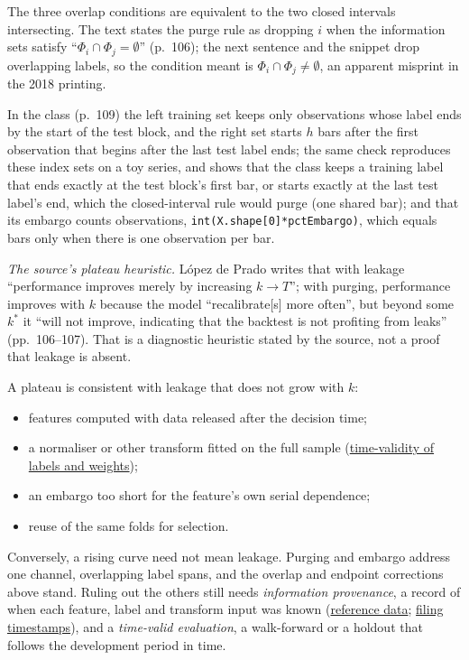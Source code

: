 \begin{qfmethod}
 The three overlap conditions are equivalent to the two closed intervals intersecting. The text states the purge rule as dropping $i$ when the information sets satisfy ``$\Phi_i\cap\Phi_j=\emptyset$'' (p.~106); the next sentence and the snippet drop overlapping labels, so the condition meant is $\Phi_i\cap\Phi_j\neq\emptyset$, an apparent misprint in the 2018 printing.

In the class (p.~109) the left training set keeps only observations whose label ends by the start of the test block, and the right set starts $h$ bars after the first observation that begins after the last test label ends; the same check reproduces these index sets on a toy series, and shows that the class keeps a training label that ends exactly at the test block's first bar, or starts exactly at the last test label's end, which the closed-interval rule would purge (one shared bar); and that its embargo counts observations, \texttt{int(X.shape[0]*pctEmbargo)}, which equals bars only when there is one observation per bar.

\emph{The source's plateau heuristic.} López de Prado writes that with leakage ``performance improves merely by increasing $k\to T$''; with purging, performance improves with $k$ because the model ``recalibrate[s] more often'', but beyond some $k^*$ it ``will not improve, indicating that the backtest is not profiting from leaks'' (pp.~106--107). That is a diagnostic heuristic stated by the source, not a proof that leakage is absent.

A plateau is consistent with leakage that does not grow with $k$:
\begin{itemize}
\item features computed with data released after the decision time;
\item a normaliser or other transform fitted on the full sample (\hyperref[pit:label-weight-leakage]{time-validity of labels and weights});
\item an embargo too short for the feature's own serial dependence;
\item reuse of the same folds for selection.
\end{itemize}
Conversely, a rising curve need not mean leakage. Purging and embargo address one channel, overlapping label spans, and the overlap and endpoint corrections above stand. Ruling out the others still needs \emph{information provenance}, a record of when each feature, label and transform input was known (\hyperref[data:trading-reference-data]{reference data}; \hyperref[data:holdings-insider-filing-lags]{filing timestamps}), and a \emph{time-valid evaluation}, a walk-forward or a holdout that follows the development period in time.


\end{qfmethod}
